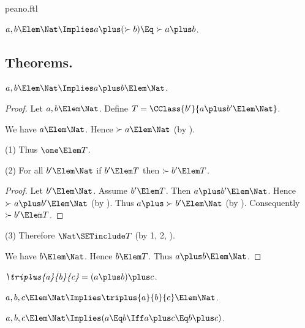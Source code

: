 \documentclass{stex}
\begin{document}
\begin{smodule}{peano.ftl}
\begin{forthel}
  \begin{axiom*}[title=18,name=P18]
    $a,b \Elem \Nat \Implies a \plus (\succ{b}) \Eq \succ{a \plus b}$.
  \end{axiom*}
\end{forthel}


\subsection{Theorems.}


\begin{forthel}
  \begin{theorem*}[title=19,name=P19]
    $a,b \Elem \Nat \Implies a \plus b \Elem \Nat$.
  \end{theorem*}
  \begin{proof}
    Let $a,b \Elem \Nat$.
    Define $T = \CClass{b'}{a \plus b' \Elem \Nat}$.
    
    We have $a \Elem \Nat$.
    Hence $\succ{a} \Elem \Nat$ (by ).
    
    (1) Thus $\one \Elem T$.

    (2) For all $b' \Elem \Nat$ if $b' \Elem T$ then $\succ{b'} \Elem T$.
    \begin{proof}
      Let $b' \Elem \Nat$.
      Assume $b' \Elem T$.
      Then $a \plus b' \Elem \Nat$.
      Hence $\succ{a \plus b'} \Elem \Nat$ (by ).
      Thus $a \plus \succ{b'} \Elem \Nat$ (by ).
      Consequently $\succ{b'} \Elem T$.
    \end{proof}

    (3) Therefore $\Nat \SETinclude T$ (by 1, 2, ).

    We have $b \Elem \Nat$.
    Hence $b \Elem T$.
    Thus $a \plus b \Elem \Nat$.
  \end{proof}

  \begin{definition*}[title=20]
    $\emph{\triplus{a}{b}{c}} = (a \plus b) \plus c$.
  \end{definition*}

  \begin{theorem*}[title=21,name=P21]
    $a,b,c \Elem \Nat \Implies \triplus{a}{b}{c} \Elem \Nat$.
  \end{theorem*}

  \begin{theorem*}[title=22,name=P22]
    $a,b,c \Elem \Nat \Implies (a \Eq b \Iff a \plus c \Eq b \plus c)$.
  \end{theorem*}


\end{forthel}
\end{smodule}
\end{document}
